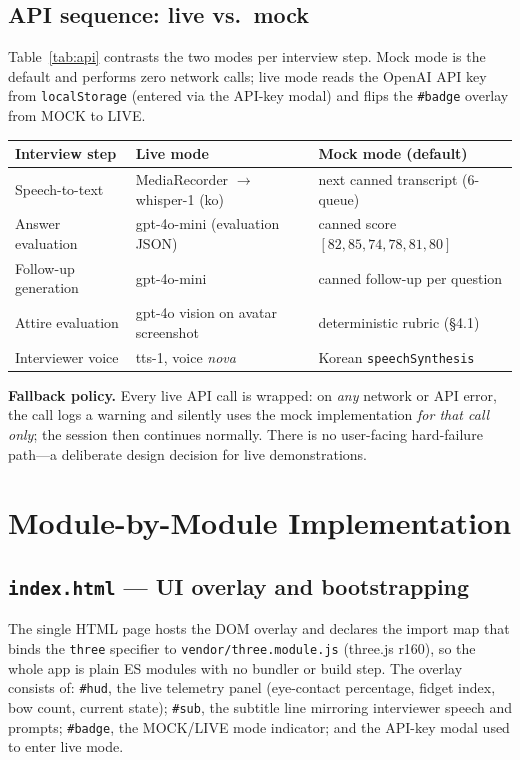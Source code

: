 \documentclass[10pt,a4paper]{article}
\begin{document}
\subsection{API sequence: live vs.\ mock}
Table~\ref{tab:api} contrasts the two modes per interview step. Mock mode is the default and performs zero network calls; live mode reads the OpenAI API key from \texttt{localStorage} (entered via the API-key modal) and flips the \texttt{\#badge} overlay from MOCK to LIVE.

\begin{center}\small
\begin{tabular}{@{}lll@{}}
\toprule
Interview step & Live mode & Mock mode (default) \\
\midrule
Speech-to-text & MediaRecorder $\rightarrow$ whisper-1 (ko) & next canned transcript (6-queue) \\
Answer evaluation & gpt-4o-mini (evaluation JSON) & canned score $[82,85,74,78,81,80]$ \\
Follow-up generation & gpt-4o-mini & canned follow-up per question \\
Attire evaluation & gpt-4o vision on avatar screenshot & deterministic rubric (\S4.1) \\
Interviewer voice & tts-1, voice \emph{nova} & Korean \texttt{speechSynthesis} \\
\bottomrule
\end{tabular}
\label{tab:api}
\end{center}

\textbf{Fallback policy.} Every live API call is wrapped: on \emph{any} network or API error, the call logs a warning and silently uses the mock implementation \emph{for that call only}; the session then continues normally. There is no user-facing hard-failure path---a deliberate design decision for live demonstrations.

\section{Module-by-Module Implementation}
\subsection{\texttt{index.html} --- UI overlay and bootstrapping}
The single HTML page hosts the DOM overlay and declares the import map that binds the \texttt{three} specifier to \texttt{vendor/three.module.js} (three.js r160), so the whole app is plain ES modules with no bundler or build step. The overlay consists of: \texttt{\#hud}, the live telemetry panel (eye-contact percentage, fidget index, bow count, current state); \texttt{\#sub}, the subtitle line mirroring interviewer speech and prompts; \texttt{\#badge}, the MOCK/LIVE mode indicator; and the API-key modal used to enter live mode.
\end{document}
